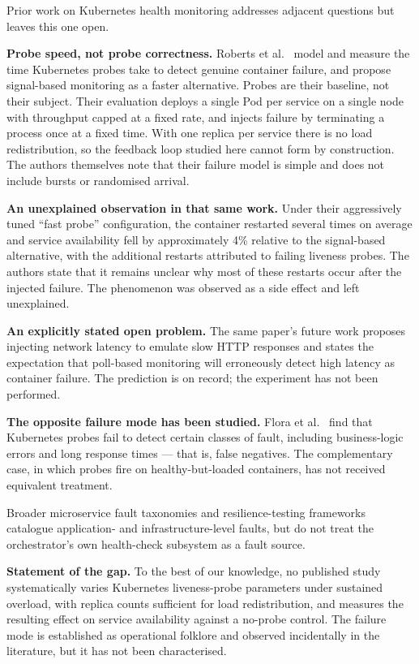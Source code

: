 \documentclass[conference]{IEEEtran}
\begin{document}
Prior work on Kubernetes health monitoring addresses adjacent
questions but leaves this one open.

\textbf{Probe speed, not probe correctness.} Roberts et
al.~\cite{roberts2025} model and measure the time Kubernetes probes
take to detect genuine container failure, and propose signal-based
monitoring as a faster alternative. Probes are their baseline, not
their subject. Their evaluation deploys a single Pod per service on a
single node with throughput capped at a fixed rate, and injects
failure by terminating a process once at a fixed time. With one
replica per service there is no load redistribution, so the feedback
loop studied here cannot form by construction. The authors themselves
note that their failure model is simple and does not include bursts or
randomised arrival.

\textbf{An unexplained observation in that same work.} Under their
aggressively tuned ``fast probe'' configuration, the container
restarted several times on average and service availability fell by
approximately 4\% relative to the signal-based alternative, with the
additional restarts attributed to failing liveness probes. The authors
state that it remains unclear why most of these restarts occur after
the injected failure. The phenomenon was observed as a side effect and
left unexplained.

\textbf{An explicitly stated open problem.} The same paper's future
work proposes injecting network latency to emulate slow HTTP responses
and states the expectation that poll-based monitoring will erroneously
detect high latency as container failure. The prediction is on record;
the experiment has not been performed.

\textbf{The opposite failure mode has been studied.} Flora et
al.~\cite{flora2022} find that Kubernetes probes fail to detect
certain classes of fault, including business-logic errors and long
response times --- that is, false negatives. The complementary case,
in which probes fire on healthy-but-loaded containers, has not
received equivalent treatment.

Broader microservice fault taxonomies \cite{silva2022,zhou2021} and
resilience-testing frameworks \cite{heorhiadi2016} catalogue
application- and infrastructure-level faults, but do not treat the
orchestrator's own health-check subsystem as a fault source.

\textbf{Statement of the gap.} To the best of our knowledge, no
published study systematically varies Kubernetes liveness-probe
parameters under sustained overload, with replica counts sufficient
for load redistribution, and measures the resulting effect on service
availability against a no-probe control. The failure mode is
established as operational folklore and observed incidentally in the
literature, but it has not been characterised.
\end{document}
